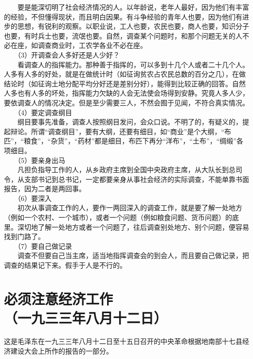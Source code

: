 \documentclass[cn,11pt,chinese]{elegantbook}
\def\myformat#1{\hfil\hfil #1}
\begin{document}
　　要是能深切明了社会经济情况的人。以年龄说，老年人最好，因为他们有丰富的经验，不但懂得现状，而且明白因果。有斗争经验的青年人也要，因为他们有进步的思想，有锐利的观察。以职业说，工人也要，农民也要，商人也要，知识分子也要，有时兵士也要，流氓也要。自然，调查某个问题时，和那个问题无关的人不必在座，如调查商业时，工农学各业不必在座。\\
　　（3）开调查会人多好还是人少好？\\
　　看调查人的指挥能力。那种善于指挥的，可以多到十几个人或者二十几个人。人多有人多的好处，就是在做统计时（如征询贫农占农民总数的百分之几），在做结论时（如征询土地分配平均分好还是差别分好），能得到比较正确的回答。自然人多也有人多的坏处，指挥能力欠缺的人会无法使会场得到安静。究竟人多人少，要依调查人的情况决定。但是至少需要三人，不然会囿于见闻，不符合真实情况。\\
　　（4）要定调查纲目\\
　　纲目要事先准备，调查人按照纲目发问，会众口说。不明了的，有疑义的，提起辩论。所谓“调查纲目”，要有大纲，还要有细目，如“商业”是个大纲，“布匹”，“粮食”，“杂货”，“药材”都是细目，布匹下再分“洋布”，“土布”，“绸缎”各项细目。\\
　　（5）要亲身出马\\
　　凡担负指导工作的人，从乡政府主席到全国中央政府主席，从大队长到总司令，从支部书记到总书记，一定都要亲身从事社会经济的实际调查，不能单靠书面报告，因为二者是两回事。\\
　　（6）要深入\\
　　初次从事调查工作的人，要作一两回深入的调查工作，就是要了解一处地方（例如一个农村、一个城市），或者一个问题（例如粮食问题、货币问题）的底里。深切地了解一处地方或者一个问题了，往后调查别处地方、别个问题，便容易找到门路了。\\
　　（7）要自己做记录\\
　　调查不但要自己当主席，适当地指挥调查会的到会人，而且要自己做记录，把调查的结果记下来。假手于人是不行的。\\
\newpage\section*{\myformat{必须注意经济工作}\\\myformat{（一九三三年八月十二日）}}
\begin{introduction}\item  这是毛泽东在一九三三年八月十二日至十五日召开的中央革命根据地南部十七县经济建设大会上所作的报告的一部分。\end{introduction}
\end{document}
